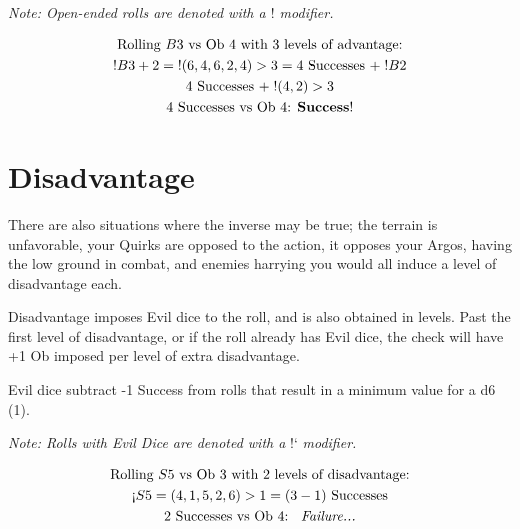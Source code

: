 \documentclass[../main.tex]{subfiles}
\begin{document}
        \emph{Note: Open-ended rolls are denoted with a $!$ modifier.}
        \\
        \begin{mdframed}[style=Arrata]
            \begin{equation*}
                \begin{gathered}
                    \text{Rolling $B$3 vs Ob 4 with 3 levels of advantage:}         \\
                    !B3 + 2 = \; !(6, 4, 6, 2, 4)>3 = 4 \text{ Successes } +\; !B2  \\
                    4 \text{ Successes } +\; !(4, 2)>3                              \\
                    4 \text{ Successes  vs Ob 4: \textbf{Success}!}
                \end{gathered}
            \end{equation*}    
        \end{mdframed}

    \section{Disadvantage}

        There are also situations where the inverse may be true; the terrain is unfavorable, your Quirks are opposed to the action, it opposes your Argos, having the low ground in combat, and enemies harrying you would all induce a level of disadvantage each.

        Disadvantage imposes Evil dice to the roll, and is also obtained in levels. Past the first level of disadvantage, or if the roll already has Evil dice, the check will have +1 Ob imposed per level of extra disadvantage.

        Evil dice subtract -1 Success from rolls that result in a minimum value for a d6 (1). 
        
        \emph{Note: Rolls with Evil Dice are denoted with a} !` \emph{modifier.}
        \\
        \begin{mdframed}[style=Arrata]
            \begin{equation*}
                \begin{gathered}
                    \text{Rolling $S5$ vs Ob 3 with 2 levels of disadvantage:}      \\
                    \text{!`}S5 = (4, 1, 5, 2, 6)>1 = (3 - 1) \text{ Successes}     \\
                    2 \text{ Successes vs Ob 4: \emph{ Failure...}}
                \end{gathered}
            \end{equation*}
        \end{mdframed}
\end{document}

